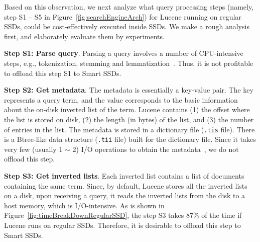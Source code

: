 


Based on this observation, we next analyze what query processing steps (namely, step S1 -- S5 in Figure~\ref{fig:searchEngineArch}) for Lucene running on regular SSDs, could be cost-effectively executed inside SSDs. We make a rough analysis first, and elaborately evaluate them by experiments.

\textbf{Step S1: Parse query}. Parsing a query involves a number of CPU-intensive steps, e.g., tokenization, stemming and lemmatization~\cite{M08}. Thus, it is not profitable to offload this step S1 to Smart SSDs.

\textbf{Step S2: Get metadata}. The metadata is essentially a key-value pair. The key represents a query term, and the value corresponds to the basic information about the on-disk inverted list of the term.  Lucene contains (1) the offset where the list is stored on disk, (2) the length (in bytes) of the list, and (3) the number of entries in the list. The metadata is stored in a dictionary file (\texttt{.tis} file). There is a Btree-like data structure (\texttt{.tii} file) built for the dictionary file. Since it takes very few (usually 1 $\sim$ 2) I/O operations to obtain the metadata~\cite{M08}, we do not offload this step.

\textbf{Step S3: Get inverted lists}. Each inverted list contains a list of documents containing the same term.
Since, by default, Lucene stores all the inverted lists on a disk, upon receiving a query, it reads the inverted lists from the disk to a host memory, which is I/O-intensive.
As is shown in Figure~\ref{fig:timeBreakDownRegularSSD}, the step S3 takes 87\% of the time if Lucene runs on regular SSDs. Therefore, it is desirable to offload this step to Smart SSDs.

